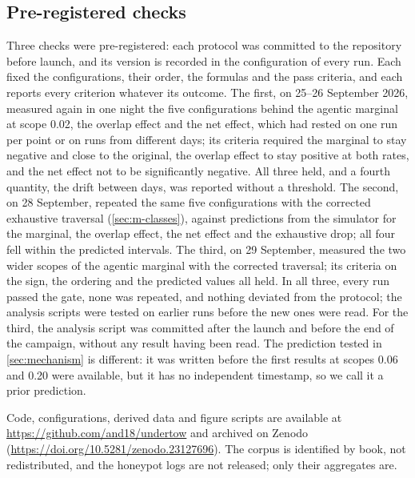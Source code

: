 \subsection{Pre-registered checks}\label{sec:m-prereg}
Three checks were pre-registered: each protocol was committed to the repository before
launch, and its version is recorded in the configuration of every run.
Each fixed the configurations, their order, the formulas and the pass criteria, and each
reports every criterion whatever its outcome.
The first, on 25--26 September 2026, measured again in one night the five configurations
behind the agentic marginal at scope 0.02, the overlap effect and the net effect, which had rested on one run
per point or on runs from different days; its criteria required the marginal to stay
negative and close to the original, the overlap effect to stay positive at both rates, and
the net effect not to be significantly negative.
All three held, and a fourth quantity, the drift between days, was reported without a
threshold.
The second, on 28 September, repeated the same five configurations with the corrected
exhaustive traversal (\cref{sec:m-classes}), against predictions from the simulator for the
marginal, the overlap effect, the net effect and the exhaustive drop; all four fell within
the predicted intervals.
The third, on 29 September, measured the two wider scopes of the agentic marginal with the
corrected
traversal; its criteria on the sign, the ordering and the predicted values all
held.
In all three, every run passed the gate, none was repeated, and nothing deviated from the
protocol; the analysis scripts were tested on earlier runs before the new ones were read.
For the third, the analysis script was committed after the launch and before the end of
the campaign, without any result having been read.
The prediction tested in \cref{sec:mechanism} is different: it was written before the
first results at scopes 0.06 and 0.20 were available, but it has no independent
timestamp, so we call it a prior prediction.

Code, configurations, derived data and figure scripts are available at \url{https://github.com/and18/undertow} and archived on Zenodo (\url{https://doi.org/10.5281/zenodo.23127696}).
The corpus is identified by book, not redistributed, and the honeypot logs are not
released; only their aggregates are.
